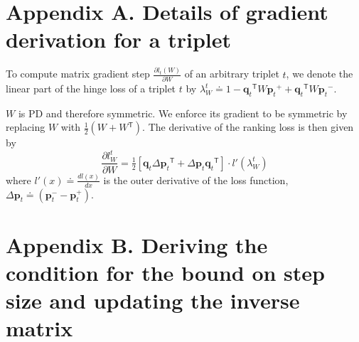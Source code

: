 \documentclass[twoside,11pt]{article}
\newcommand\mat[1]{{#1}}
\renewcommand\vec[1]{\mathbf{#1}}
\newcommand{\T}{{}^\mathsf{T}}
\newcommand{\W}{\mat{W}}
\newcommand{\eqdef}{\doteq}
\newcommand{\ignore}[1]{}
\newcommand{\q}{{\vec{q}}}
\newcommand{\p}{{\vec{p}}}
\newcommand{\trip}{{t}}
\newcommand{\qt}{{\q_{\trip}}}
\newcommand{\pt}{{\p_{\trip}}}
\begin{document}


\ignore{We would like to thank Prof. Tim Davis for fruitful discussions and for his assistance with utilizing the Cholesky decomposition row-column updates with the CHOLMOD solver.} 

\newpage

\appendix
\section*{Appendix A. Details of gradient derivation for a triplet}
\label{appendix-grad}

To compute matrix gradient step $\frac{\partial {l_t (\W)}}{\partial \W}$ of an arbitrary triplet $t$, we denote the linear part of the hinge loss of a triplet $t$ by $\lambda_{W}^t \eqdef 
1-\qt\T \W \pt^{+} + \qt\T\W\pt^{-}.$

$\W$ is PD and therefore symmetric. We enforce its gradient to be symmetric by replacing $\W$ with $\tfrac{1}{2}(\W + \W\T)$.
The derivative of the ranking loss is then given by
\begin{equation}
\frac{\partial {l_{\W}^{t}}}{\partial \W} = \tfrac{1}{2}[\vec{q}_{t}\Delta\vec{p}_{t}\T  + \Delta\vec{p}_{t}\vec{q}_{t}\T]\cdot {l'}(\lambda_{W}^t)
\label{dlossranking}
\nonumber 
\end{equation} where $l'(x) \eqdef \frac{d{l(x)}}{dx}$ is the outer derivative of the loss function, $\Delta\vec{p}_{t} \eqdef (\vec{p}_{t}^{-} - \vec{p}_{t}^{+})$.

\section*{Appendix B. Deriving the condition for the bound on step size and updating the inverse matrix}
\label{appendix-inverse}
\end{document}
